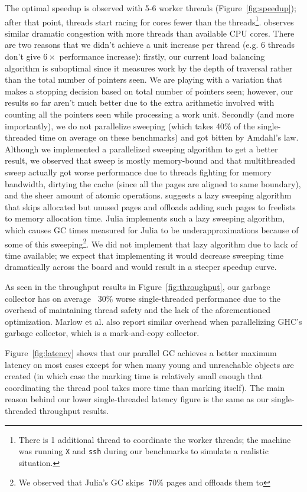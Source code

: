 The optimal speedup is observed with 5-6 worker threads (Figure~\ref{fig:speedup}); after that point, threads start racing for cores fewer than the threads\footnote{There is 1 additional thread to coordinate the worker threads; the machine was running \texttt{X} and \texttt{ssh} during our benchmarks to simulate a realistic situation.}.
\cite{marlow2011multicore} observes similar dramatic congestion with more threads than available CPU cores.
There are two reasons that we didn't achieve a unit increase per thread (e.g. 6 threads don't give $6\times$ performance increase):
firstly, our current load balancing algorithm is suboptimal since it measures work by the depth of traversal rather than the total number of pointers seen.
We are playing with a variation that makes a stopping decision based on total number of pointers seen; however, our results so far aren't much better due to the extra arithmetic involved with counting all the pointers seen while processing a work unit.
Secondly (and more importantly), we do not parallelize sweeping (which takes 40\% of the single-threaded time on average on these benchmarks) and got bitten by Amdahl's law.
Although we implemented a parallelized sweeping algorithm to get a better result, we observed that sweep is mostly memory-bound and that multithreaded sweep actually got worse performance due to threads fighting for memory bandwidth, dirtying the cache (since all the pages are aligned to same boundary), and the sheer amount of atomic operations.
\cite{boehm1991mostly} suggests a lazy sweeping algorithm that skips allocated but unused pages and offloads adding such pages to freelists to memory allocation time.
Julia implements such a lazy sweeping algorithm, which causes GC times measured for Julia to be underapproximations because of some of this sweeping\footnote{We observed that Julia's GC skips $~70\%$ pages and offloads them to }.
We did not implement that lazy algorithm due to lack of time available; we expect that implementing it would decrease sweeping time dramatically across the board and would result in a steeper speedup curve.

As seen in the throughput results in Figure~\ref{fig:throughput}, our garbage collector has on average ~30\% worse single-threaded performance due to the overhead of maintaining thread safety and the lack of the aforementioned optimization.
Marlow et al. \cite{marlow2008parallel} also report similar overhead when parallelizing GHC's garbage collector, which is a mark-and-copy collector.

Figure~\ref{fig:latency} shows that our parallel GC achieves a better maximum latency on most cases except for when many young and unreachable objects are created (in which case the marking time is relatively small enough that coordinating the thread pool takes more time than marking itself).
The main reason behind our lower single-threaded latency figure is the same as our single-threaded throughput results.

